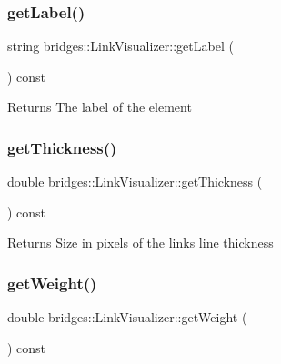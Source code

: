 \subsubsection{\texorpdfstring{get\+Label()}{getLabel()}}
{\footnotesize\ttfamily string bridges\+::\+Link\+Visualizer\+::get\+Label (\begin{DoxyParamCaption}{ }\end{DoxyParamCaption}) const\hspace{0.3cm}{\ttfamily [inline]}}

\begin{DoxyReturn}{Returns}
The label of the element 
\end{DoxyReturn}
\mbox{\label{classbridges_1_1_link_visualizer_ae08a5f5fc9e83ea3b3d4ebebc245d3b4}} 
\subsubsection{\texorpdfstring{get\+Thickness()}{getThickness()}}
{\footnotesize\ttfamily double bridges\+::\+Link\+Visualizer\+::get\+Thickness (\begin{DoxyParamCaption}{ }\end{DoxyParamCaption}) const\hspace{0.3cm}{\ttfamily [inline]}}

\begin{DoxyReturn}{Returns}
Size in pixels of the link\textquotesingle{}s line thickness 
\end{DoxyReturn}
\mbox{\label{classbridges_1_1_link_visualizer_a2c59c476617c2520b4730a14df65400e}} 
\subsubsection{\texorpdfstring{get\+Weight()}{getWeight()}}
{\footnotesize\ttfamily double bridges\+::\+Link\+Visualizer\+::get\+Weight (\begin{DoxyParamCaption}{ }\end{DoxyParamCaption}) const\hspace{0.3cm}{\ttfamily [inline]}}

